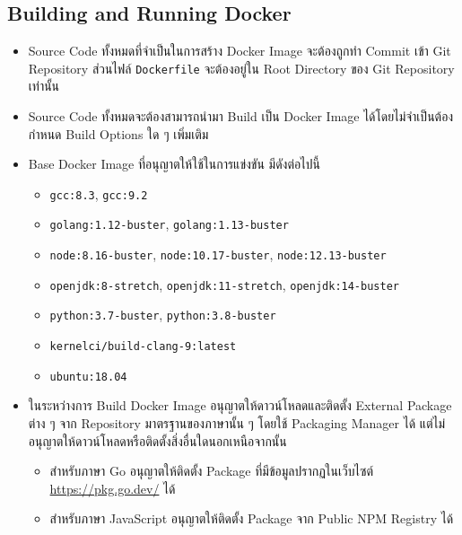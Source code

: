\subsection{Building and Running Docker}

\begin{itemize}
    \item
        Source Code ทั้งหมดที่จำเป็นในการสร้าง Docker Image จะต้องถูกทำ Commit เข้า Git Repository \;
        ส่วนไฟล์ \verb'Dockerfile' จะต้องอยู่ใน Root Directory ของ Git Repository เท่านั้น
    \item
        Source Code ทั้งหมดจะต้องสามารถนำมา Build เป็น Docker Image ได้โดยไม่จำเป็นต้องกำหนด Build Options ใด ๆ เพิ่มเติม \;
    \item
        Base Docker Image ที่อนุญาตให้ใช้ในการแข่งขัน มีดังต่อไปนี้
        \begin{itemize}[topsep=0pc,itemsep=0pc]
            \item \verb'gcc:8.3', \verb'gcc:9.2'
            \item \verb'golang:1.12-buster', \verb'golang:1.13-buster'
            \item \verb'node:8.16-buster', \verb'node:10.17-buster', \verb'node:12.13-buster'
            \item \verb'openjdk:8-stretch', \verb'openjdk:11-stretch', \verb'openjdk:14-buster'
            \item \verb'python:3.7-buster', \verb'python:3.8-buster'
            \item \verb'kernelci/build-clang-9:latest'
            \item \verb'ubuntu:18.04'
        \end{itemize}
    \item
        ในระหว่างการ Build Docker Image อนุญาตให้ดาวน์โหลดและติดตั้ง External Package ต่าง ๆ จาก Repository มาตรฐานของภาษานั้น ๆ โดยใช้ Packaging Manager ได้ แต่ไม่อนุญาตให้ดาวน์โหลดหรือติดตั้งสิ่งอื่นใดนอกเหนือจากนั้น
        \begin{itemize}[topsep=0pc,itemsep=0pc]
            \item
                สำหรับภาษา Go อนุญาตให้ติดตั้ง Package ที่มีข้อมูลปรากฏในเว็บไซต์ \\
                \url{https://pkg.go.dev/} ได้
            \item
                สำหรับภาษา JavaScript อนุญาตให้ติดตั้ง Package จาก Public NPM Registry ได้ \\

\end{itemize}
\end{itemize}
